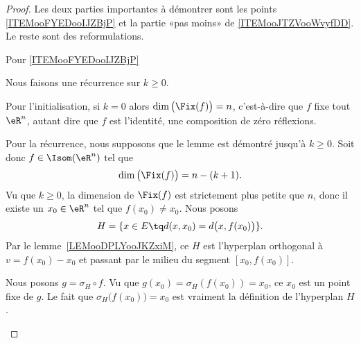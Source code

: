 \begin{proof}
    Les deux parties importantes à démontrer sont les points \ref{ITEMooFYEDooIJZBjP} et la partie «pas moins» de \ref{ITEMooJTZVooWvyfDD}. Le reste sont des reformulations.
        \begin{subproof}
        \item[Pour \ref{ITEMooFYEDooIJZBjP}]

    Nous faisons une récurrence sur \( k\geq 0\).

    Pour l'initialisation, si \( k=0\) alors \( \dim\big( \Fix(f) \big)=n\), c'est-à-dire que \( f\) fixe tout \( \eR^n\), autant dire que \( f\) est l'identité, une composition de zéro réflexions.

    Pour la récurrence, nous supposons que le lemme est démontré jusqu'à \( k\geq 0\). Soit donc \( f\in\Isom(\eR^n)\) tel que
    \begin{equation}
        \dim\big( \Fix(f) \big)=n-(k+1).
    \end{equation}
    Vu que \( k\geq 0\), la dimension de \( \Fix(f)\) est strictement plus petite que \( n\), donc il existe un \( x_0\in \eR^n\) tel que \( f(x_0)\neq x_0\). Nous posons
    \begin{equation}
        H=\{ x\in E\tq d(x,x_0)=d\big( x,f(x_0) \big)  \}.
    \end{equation}
    Par le lemme~\ref{LEMooDPLYooJKZxiM}, ce \( H\) est l'hyperplan orthogonal à \( v=f(x_0)-x_0\) et passant par le milieu du segment \( [x_0,f(x_0)]\).

    Nous posons \( g=\sigma_H\circ f\). Vu que \( g(x_0)=\sigma_H(f(x_0))=x_0\), ce \( x_0\) est un point fixe de \( g\). Le fait que \( \sigma_H\big( f(x_0) \big)=x_0\) est vraiment la définition de l'hyperplan \( H\).


\end{subproof}
\end{proof}
